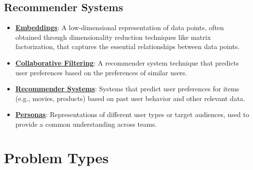 \documentclass{article}%
\begin{document}
\subsection{Recommender Systems}%
\label{subsec:RecommenderSystems}%
\begin{itemize}[leftmargin=*]%
\item \href{https://purdue.brightspace.com/d2l/common/assets/pdfjs-d2l-dist/1.0.14-legacy/web/viewer.html?file=\%2Fcontent\%2Fenforced\%2F1095467-wl.202510.CS.24300.001\%2F11L2-svd-pca-recommender.pdf\%3Fou\%3D1095467\&lang=en-us\&container=d2l-fileviewer-rendered-pdf\&fullscreen=d2l-fileviewer-rendered-pdf-dialog\&height=667#page=5}{\textbf{Embeddings}}: A low-dimensional representation of data points, often obtained through dimensionality reduction techniques like matrix factorization, that captures the essential relationships between data points.%
\item \href{https://purdue.brightspace.com/d2l/common/assets/pdfjs-d2l-dist/1.0.14-legacy/web/viewer.html?file=\%2Fcontent\%2Fenforced\%2F1095467-wl.202510.CS.24300.001\%2F11L2-svd-pca-recommender.pdf\%3Fou\%3D1095467\&lang=en-us\&container=d2l-fileviewer-rendered-pdf\&fullscreen=d2l-fileviewer-rendered-pdf-dialog\&height=667#page=33}{\textbf{Collaborative Filtering}}: A recommender system technique that predicts user preferences based on the preferences of similar users.%
\item \href{https://purdue.brightspace.com/d2l/common/assets/pdfjs-d2l-dist/1.0.14-legacy/web/viewer.html?file=\%2Fcontent\%2Fenforced\%2F1095467-wl.202510.CS.24300.001\%2F11L2-svd-pca-recommender.pdf\%3Fou\%3D1095467\&lang=en-us\&container=d2l-fileviewer-rendered-pdf\&fullscreen=d2l-fileviewer-rendered-pdf-dialog\&height=667#page=29}{\textbf{Recommender Systems}}: Systems that predict user preferences for items (e.g., movies, products) based on past user behavior and other relevant data.%
\item \href{https://purdue.brightspace.com/d2l/common/assets/pdfjs-d2l-dist/1.0.14-legacy/web/viewer.html?file=\%2Fcontent\%2Fenforced\%2F1095467-wl.202510.CS.24300.001\%2F12L2-distance-clusters.pdf\%3Fou\%3D1095467\&lang=en-us\&container=d2l-fileviewer-rendered-pdf\&fullscreen=d2l-fileviewer-rendered-pdf-dialog\&height=667#page=11}{\textbf{Personas}}: Representations of different user types or target audiences, used to provide a common understanding across teams.%
\end{itemize}

%
\section{Problem Types}%
\label{sec:ProblemTypes}%
\end{document}
